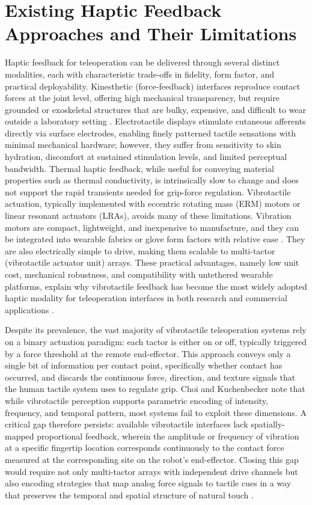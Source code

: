 \documentclass[12pt, a4paper]{report}
\begin{document}
\section{Existing Haptic Feedback Approaches and Their Limitations}
Haptic feedback for teleoperation can be delivered through several distinct modalities, each with characteristic trade-offs in fidelity, form factor, and practical deployability. Kinesthetic (force-feedback) interfaces reproduce contact forces at the joint level, offering high mechanical transparency, but require grounded or exoskeletal structures that are bulky, expensive, and difficult to wear outside a laboratory setting \cite{pacchierotti2017}. Electrotactile displays stimulate cutaneous afferents directly via surface electrodes, enabling finely patterned tactile sensations with minimal mechanical hardware; however, they suffer from sensitivity to skin hydration, discomfort at sustained stimulation levels, and limited perceptual bandwidth. Thermal haptic feedback, while useful for conveying material properties such as thermal conductivity, is intrinsically slow to change and does not support the rapid transients needed for grip-force regulation. Vibrotactile actuation, typically implemented with eccentric rotating mass (ERM) motors or linear resonant actuators (LRAs), avoids many of these limitations. Vibration motors are compact, lightweight, and inexpensive to manufacture, and they can be integrated into wearable fabrics or glove form factors with relative ease \cite{pacchierotti2017}. They are also electrically simple to drive, making them scalable to multi-tactor (vibrotactile actuator unit) arrays. These practical advantages, namely low unit cost, mechanical robustness, and compatibility with untethered wearable platforms, explain why vibrotactile feedback has become the most widely adopted haptic modality for teleoperation interfaces in both research and commercial applications \cite{choi2013}.

Despite its prevalence, the vast majority of vibrotactile teleoperation systems rely on a binary actuation paradigm: each tactor is either on or off, typically triggered by a force threshold at the remote end-effector. This approach conveys only a single bit of information per contact point, specifically whether contact has occurred, and discards the continuous force, direction, and texture signals that the human tactile system uses to regulate grip. Choi and Kuchenbecker \cite{choi2013} note that while vibrotactile perception supports parametric encoding of intensity, frequency, and temporal pattern, most systems fail to exploit these dimensions. A critical gap therefore persists: available vibrotactile interfaces lack spatially-mapped proportional feedback, wherein the amplitude or frequency of vibration at a specific fingertip location corresponds continuously to the contact force measured at the corresponding site on the robot's end-effector. Closing this gap would require not only multi-tactor arrays with independent drive channels but also encoding strategies that map analog force signals to tactile cues in a way that preserves the temporal and spatial structure of natural touch \cite{pacchierotti2017}.
\end{document}
